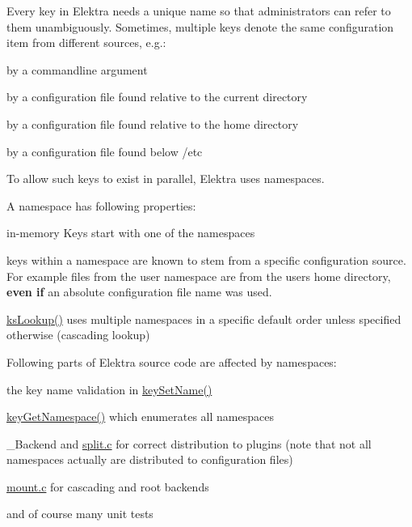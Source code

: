 Every key in Elektra needs a unique name so that administrators can refer to them unambiguously. Sometimes, multiple keys denote the same configuration item from different sources, e.\+g.\+:


\begin{DoxyItemize}
\item by a commandline argument
\item by a configuration file found relative to the current directory
\item by a configuration file found relative to the home directory
\item by a configuration file found below /etc
\end{DoxyItemize}

To allow such keys to exist in parallel, Elektra uses namespaces.

A namespace has following properties\+:


\begin{DoxyItemize}
\item in-\/memory Keys start with one of the namespaces
\item keys within a namespace are known to stem from a specific configuration source. For example files from the {\ttfamily user} namespace are from the users home directory, {\bfseries even if} an absolute configuration file name was used.
\item \hyperlink{group__keyset_gaa34fc43a081e6b01e4120daa6c112004}{ks\+Lookup()} uses multiple namespaces in a specific default order unless specified otherwise (cascading lookup)
\end{DoxyItemize}

Following parts of Elektra source code are affected by namespaces\+:


\begin{DoxyItemize}
\item the key name validation in \hyperlink{group__keyname_ga7699091610e7f3f43d2949514a4b35d9}{key\+Set\+Name()}
\item \hyperlink{group__keyname_gafc3ca03ed10f87eb59bdc02cf2a0de8d}{key\+Get\+Namespace()} which enumerates all namespaces
\item \+\_\+\+Backend and \hyperlink{split_8c}{split.\+c} for correct distribution to plugins (note that not all namespaces actually are distributed to configuration files)
\item \hyperlink{mount_8c}{mount.\+c} for cascading and root backends
\item and of course many unit tests
\end{DoxyItemize}

